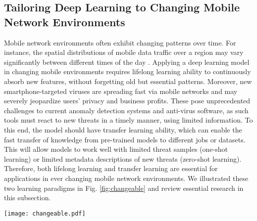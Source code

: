 \documentclass[journal,comsoc,letter]{IEEEtran}
\begin{document}
\subsection{Tailoring Deep Learning to Changing Mobile Network Environments}\label{sec:changing}
Mobile network environments often exhibit changing patterns over time. For instance, the spatial distributions of mobile data traffic over a region may vary significantly between different times of the day \cite{furno2017joint}. Applying a deep learning model in changing mobile environments requires lifelong learning ability to continuously absorb new features, without forgetting old but essential patterns. Moreover, new smartphone-targeted viruses are spreading fast via mobile networks and may severely jeopardize users' privacy and business profits. These pose unprecedented challenges to current anomaly detection systems and anti-virus software, as such tools must react to new threats in a timely manner, using limited information. To this end, the model should have transfer learning ability, which can enable the fast transfer of knowledge from pre-trained models to different jobs or datasets. This will allow models to work well with limited threat samples (one-shot learning) or limited metadata descriptions of new threats (zero-shot learning). Therefore, both lifelong learning and transfer learning are essential for applications in ever changing mobile network environments. We illustrated these two learning paradigms in Fig. \ref{fig:changeable} and review essential research in this subsection.\\

\begin{figure*}[htb]
\begin{center}
\texttt{[image: changeable.pdf]}
\end{center}
\caption{\label{fig:changeable} The underlying principles of deep lifelong learning (left) and deep transfer learning (right). Lifelong learning retains the knowledge learned while transfer learning exploits labeled data of one domain to learn in a new target domain.}
\end{figure*}
\end{document}
